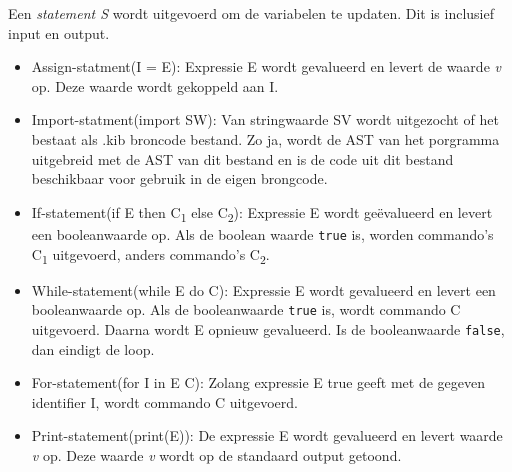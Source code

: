 Een \emph{statement S} wordt uitgevoerd om de variabelen te updaten. Dit is inclusief input en output.
\begin{itemize}
    \item Assign-statment(I = E): Expressie E wordt gevalueerd en levert de waarde \emph{v} op. Deze waarde wordt gekoppeld aan I.
    \item Import-statment(import SW): Van stringwaarde SV wordt uitgezocht of het bestaat als .kib broncode bestand. Zo ja, wordt de AST van het porgramma uitgebreid met de AST van dit bestand en is de code uit dit bestand beschikbaar voor gebruik in de eigen brongcode.
    \item If-statement(if E then C\textsubscript{1} else C\textsubscript{2}): Expressie E wordt ge\"evalueerd en levert een booleanwaarde op. Als de boolean waarde \texttt{true} is, worden commando's C\textsubscript{1} uitgevoerd, anders commando's C\textsubscript{2}. 
    \item While-statement(while E do C): Expressie E wordt gevalueerd en levert een booleanwaarde op. Als de booleanwaarde \texttt{true} is, wordt commando C uitgevoerd. Daarna wordt E opnieuw gevalueerd. Is de booleanwaarde \texttt{false}, dan eindigt de loop.
    \item For-statement(for I in E C): Zolang expressie E true geeft met de gegeven identifier I, wordt commando C uitgevoerd.
    \item Print-statement(print(E)): De expressie E wordt gevalueerd en levert waarde \emph{v} op. Deze waarde \emph{v} wordt op de standaard output getoond.
\end{itemize}

